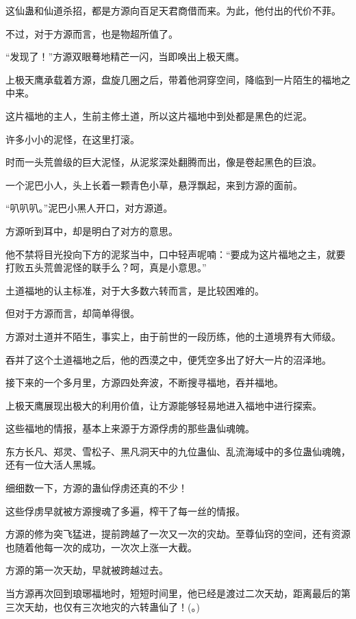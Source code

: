 \begin{this_body}
这仙蛊和仙道杀招，都是方源向百足天君商借而来。为此，他付出的代价不菲。

不过，对于方源而言，也是物超所值了。

“发现了！”方源双眼蓦地精芒一闪，当即唤出上极天鹰。

上极天鹰承载着方源，盘旋几圈之后，带着他洞穿空间，降临到一片陌生的福地之中来。

这片福地的主人，生前主修土道，所以这片福地中到处都是黑色的烂泥。

许多小小的泥怪，在这里打滚。

时而一头荒兽级的巨大泥怪，从泥浆深处翻腾而出，像是卷起黑色的巨浪。

一个泥巴小人，头上长着一颗青色小草，悬浮飘起，来到方源的面前。

“叭叭叭。”泥巴小黑人开口，对方源道。

方源听到耳中，却是明白了对方的意思。

他不禁将目光投向下方的泥浆当中，口中轻声呢喃：“要成为这片福地之主，就要打败五头荒兽泥怪的联手么？呵，真是小意思。”

土道福地的认主标准，对于大多数六转而言，是比较困难的。

但对于方源而言，却简单得很。

方源对土道并不陌生，事实上，由于前世的一段历练，他的土道境界有大师级。

吞并了这个土道福地之后，他的西漠之中，便凭空多出了好大一片的沼泽地。

接下来的一个多月里，方源四处奔波，不断搜寻福地，吞并福地。

上极天鹰展现出极大的利用价值，让方源能够轻易地进入福地中进行探索。

这些福地的情报，基本上来源于方源俘虏的那些蛊仙魂魄。

东方长凡、郑灵、雪松子、黑凡洞天中的九位蛊仙、乱流海域中的多位蛊仙魂魄，还有一位大活人黑城。

细细数一下，方源的蛊仙俘虏还真的不少！

这些俘虏早就被方源搜魂了多遍，榨干了每一丝的情报。

方源的修为突飞猛进，提前跨越了一次又一次的灾劫。至尊仙窍的空间，还有资源也随着他每一次的成功，一次次上涨一大截。

方源的第一次天劫，早就被跨越过去。

当方源再次回到琅琊福地时，短短时间里，他已经是渡过二次天劫，距离最后的第三次天劫，也仅有三次地灾的六转蛊仙了！(。)

\end{this_body}

